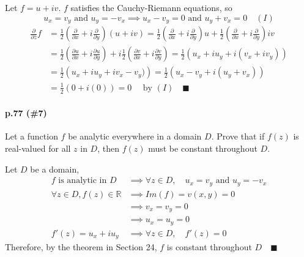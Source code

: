 \documentclass{article}
\newcommand\R{\mathbb{R}}
\begin{document}
Let $f = u+iv$. $f$ satisfies the Cauchy-Riemann equations, so
\[u_x = v_y \text{ and } u_y = -v_x \implies u_x -v_y = 0 \text{ and
  } u_y + v_x = 0\quad (I)\]
\begin{align*}
  \frac{\partial}{\partial{\bar{z}}}f &= \frac{1}{2}\left(
    \frac{\partial}{\partial{x}}+i\frac{\partial}{\partial{y}}
                                        \right)(u+iv)
                                      = \frac{1}{2}\left(
    \frac{\partial}{\partial{x}}+i\frac{\partial}{\partial{y}}
                                        \right)u + \frac{1}{2}\left(
    \frac{\partial}{\partial{x}}+i\frac{\partial}{\partial{y}}
                                        \right)iv \\
                                      &= \frac{1}{2}\left(
    \frac{\partial{u}}{\partial{x}}+i\frac{\partial{u}}{\partial{y}}
                                        \right) + i\frac{1}{2}\left(
    \frac{\partial{v}}{\partial{x}}+i\frac{\partial{v}}{\partial{y}}
                                        \right)
                                      =\frac{1}{2}\left( u_x +iu_y
                                        +i(v_x + iv_y) \right)\\
                                      &= \frac{1}{2}\left( u_x +iu_y
                                        +iv_x -v_y)\right) =
                                        \frac{1}{2}\left( u_x - v_y +i(u_y
                                        +v_x)\right)\\
                                      &= \frac{1}{2}\left(0
                                        +i(0)\right) = 0\quad\text{ by
                                        } (I)\quad\blacksquare
\end{align*}
\newpage
\paragraph{p.77 \color{blue} (\#7)\color{black}}

Let a function $f$ be analytic everywhere in a domain $D$. Prove that
if $f (z)$ is real-valued for all $z$ in $D$, then $f (z)$ must be
constant throughout $D$.

 Let $D$ be a domain,
\begin{align*} f \text{ is analytic in } D &\implies \forall z \in
D,\quad
                                             u_x = v_y \text{ and } u_y = -v_x \\
  \forall z \in D, f(z)\in \R &\implies Im(f) = v(x,y) = 0\\
                                          &\implies v_x = v_y = 0 \\
                                           & \implies u_x = u_y = 0\\
  f'(z) = u_x + iu_y &\implies \forall z \in D,\quad f'(z) = 0
\end{align*}
Therefore, by the theorem in Section 24, $f$ is constant throughout
$D\quad \blacksquare$
\end{document}
